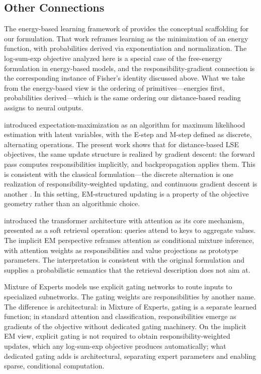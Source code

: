 \subsection{Other Connections}

The energy-based learning framework of \citet{lecun2006tutorial} provides the conceptual scaffolding for our formulation. That work reframes learning as the minimization of an energy function, with probabilities derived via exponentiation and normalization. The log-sum-exp objective analyzed here is a special case of the free-energy formulation in energy-based models, and the responsibility-gradient connection is the corresponding instance of Fisher's identity discussed above. What we take from the energy-based view is the ordering of primitives---energies first, probabilities derived---which is the same ordering our distance-based reading assigns to neural outputs.

\citet{dempster1977maximum} introduced expectation-maximization as an algorithm for maximum likelihood estimation with latent variables, with the E-step and M-step defined as discrete, alternating operations. The present work shows that for distance-based LSE objectives, the same update structure is realized by gradient descent: the forward pass computes responsibilities implicitly, and backpropagation applies them. This is consistent with the classical formulation---the discrete alternation is one realization of responsibility-weighted updating, and continuous gradient descent is another \citep[cf.][]{neal1998view}. In this setting, EM-structured updating is a property of the objective geometry rather than an algorithmic choice.

\citet{vaswani2017attention} introduced the transformer architecture with attention as its core mechanism, presented as a soft retrieval operation: queries attend to keys to aggregate values. The implicit EM perspective reframes attention as conditional mixture inference, with attention weights as responsibilities and value projections as prototype parameters. The interpretation is consistent with the original formulation and supplies a probabilistic semantics that the retrieval description does not aim at.

Mixture of Experts models \citep{jacobs1991adaptive} use explicit gating networks to route inputs to specialized subnetworks. The gating weights are responsibilities by another name. The difference is architectural: in Mixture of Experts, gating is a separate learned function; in standard attention and classification, responsibilities emerge as gradients of the objective without dedicated gating machinery. On the implicit EM view, explicit gating is not required to obtain responsibility-weighted updates, which any log-sum-exp objective produces automatically; what dedicated gating adds is architectural, separating expert parameters and enabling sparse, conditional computation.
